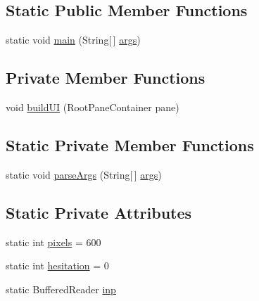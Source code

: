 \subsection*{Static Public Member Functions}
\begin{DoxyCompactItemize}
\item 
static void \hyperlink{classDisplay_a370a6dfd8b82e623b880a7839a46eb4f}{main} (String\mbox{[}$\,$\mbox{]} \hyperlink{structargs}{args})
\end{DoxyCompactItemize}
\subsection*{Private Member Functions}
\begin{DoxyCompactItemize}
\item 
void \hyperlink{classDisplay_a05d1a3f17cc42ca3637d34519635f52a}{build\-U\-I} (Root\-Pane\-Container pane)
\end{DoxyCompactItemize}
\subsection*{Static Private Member Functions}
\begin{DoxyCompactItemize}
\item 
static void \hyperlink{classDisplay_abd77a4673e2771dbd81a66f42428f2d5}{parse\-Args} (String\mbox{[}$\,$\mbox{]} \hyperlink{structargs}{args})
\end{DoxyCompactItemize}
\subsection*{Static Private Attributes}
\begin{DoxyCompactItemize}
\item 
static int \hyperlink{classDisplay_a247c0c4133ed9473291fffb5fb306eb6}{pixels} = 600
\item 
static int \hyperlink{classDisplay_a729577a067708ad0dfcb58cee0b52edc}{hesitation} = 0
\item 
static Buffered\-Reader \hyperlink{classDisplay_ab1275d12db7247b4fb90a12736d6cd09}{inp}
\end{DoxyCompactItemize}


